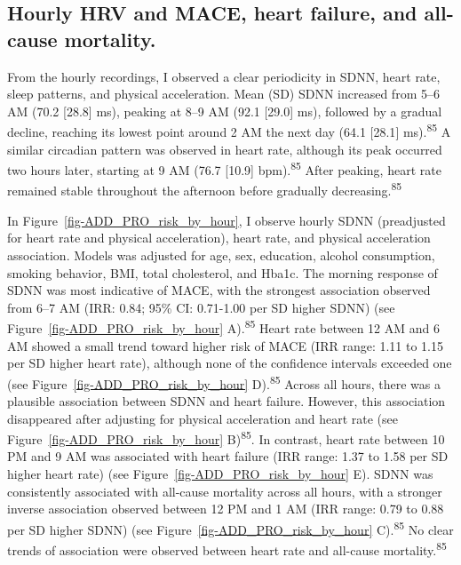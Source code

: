 \documentclass[
  letterpaper,
  headsepline=true,
  open=any]{scrbook}
\begin{document}
\hypertarget{hourly-hrv-and-mace-heart-failure-and-all-cause-mortality.}{%
\subsection{Hourly HRV and MACE, heart failure, and all-cause
mortality.}\label{hourly-hrv-and-mace-heart-failure-and-all-cause-mortality.}}

From the hourly recordings, I observed a clear periodicity in SDNN,
heart rate, sleep patterns, and physical acceleration. Mean (SD) SDNN
increased from 5--6 AM (70.2 {[}28.8{]} ms), peaking at 8--9 AM (92.1
{[}29.0{]} ms), followed by a gradual decline, reaching its lowest point
around 2 AM the next day (64.1 {[}28.1{]} ms).\textsuperscript{85} A
similar circadian pattern was observed in heart rate, although its peak
occurred two hours later, starting at 9 AM (76.7 {[}10.9{]}
bpm).\textsuperscript{85} After peaking, heart rate remained stable
throughout the afternoon before gradually
decreasing.\textsuperscript{85}

In Figure~\ref{fig-ADD_PRO_risk_by_hour}, I observe hourly SDNN
(preadjusted for heart rate and physical acceleration), heart rate, and
physical acceleration association. Models was adjusted for age, sex,
education, alcohol consumption, smoking behavior, BMI, total
cholesterol, and Hba1c. The morning response of SDNN was most indicative
of MACE, with the strongest association observed from 6--7 AM (IRR:
0.84; 95\% CI: 0.71-1.00 per SD higher SDNN) (see
Figure~\ref{fig-ADD_PRO_risk_by_hour} A).\textsuperscript{85} Heart rate
between 12 AM and 6 AM showed a small trend toward higher risk of MACE
(IRR range: 1.11 to 1.15 per SD higher heart rate), although none of the
confidence intervals exceeded one (see
Figure~\ref{fig-ADD_PRO_risk_by_hour} D).\textsuperscript{85} Across all
hours, there was a plausible association between SDNN and heart failure.
However, this association disappeared after adjusting for physical
acceleration and heart rate (see Figure~\ref{fig-ADD_PRO_risk_by_hour}
B)\textsuperscript{85}. In contrast, heart rate between 10 PM and 9 AM
was associated with heart failure (IRR range: 1.37 to 1.58 per SD higher
heart rate) (see Figure~\ref{fig-ADD_PRO_risk_by_hour} E). SDNN was
consistently associated with all-cause mortality across all hours, with
a stronger inverse association observed between 12 PM and 1 AM (IRR
range: 0.79 to 0.88 per SD higher SDNN) (see
Figure~\ref{fig-ADD_PRO_risk_by_hour} C).\textsuperscript{85} No clear
trends of association were observed between heart rate and all-cause
mortality.\textsuperscript{85}
\end{document}
